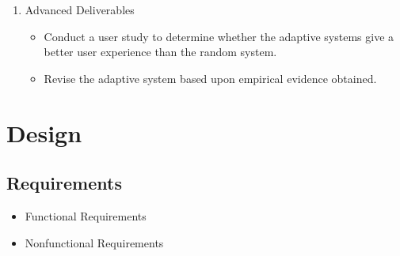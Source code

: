 \documentclass[12pt,a4paper]{article}
\begin{document}
\begin{itemize}
\begin{enumerate}
			\item Advanced Deliverables
			\begin{itemize}
				\item Conduct a user study to determine whether the adaptive systems give a better user experience than the random system.
				\item Revise the adaptive system based upon empirical evidence obtained.
			\end{itemize}
		\end{enumerate}
		
	\end{itemize}

\section{Design}







\subsection{Requirements}

	\begin{itemize}
		\item Functional Requirements
		\item Nonfunctional Requirements
	\end{itemize}
\end{document}
